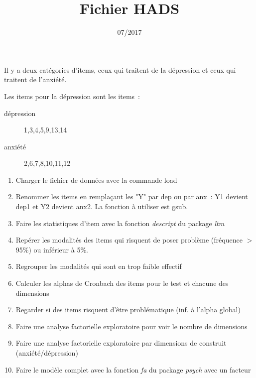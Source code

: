 \documentclass{article}\usepackage[]{graphicx}\usepackage[]{color}
\title{Fichier HADS}
\date{07/2017}
\begin{document}
	\maketitle

Il y a deux catégories d'items, ceux qui traitent de la dépression et ceux qui traitent de l'anxiété.

Les items pour la dépression sont les items~:
\begin{description}
  \item[dépression] 1,3,4,5,9,13,14
  \item[anxiété] 2,6,7,8,10,11,12
\end{description}

\begin{enumerate}
  \item Charger le fichier de données avec la commande load


  \item Renommer les items en remplaçant les "Y" par dep ou par anx~: Y1 devient dep1 et Y2 devient anx2. La fonction à utiliser est gsub.


  \item Faire les statistiques d'item avec la fonction \emph{descript} du package \emph{ltm}


  \item Repérer les modalités des items qui risquent de poser problème (fréquence $>$ 95\%) ou inférieur à 5\%.


  \item Regrouper les modalités qui sont en trop faible effectif
  
  



  \item Calculer les alphas de Cronbach des items pour le test et chacune des dimensions
  


  \item Regarder si des items risquent d'être problématique (inf. à l'alpha global)


  \item Faire une analyse factorielle exploratoire pour voir le nombre de dimensions
  


  \item Faire une analyse factorielle exploratoire par dimensions de construit (anxiété/dépression)
  




  \item Faire le modèle complet avec la fonction \emph{fa} du package \emph{psych} avec un facteur




\end{enumerate}
\end{document}
